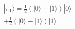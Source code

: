 \documentclass[preview]{standalone}
\begin{document}
\begin{align*}
|\pi_1 \rangle = \frac{1}{2} (|0\rangle - |1\rangle) |0\rangle \\ + \frac{1}{2}(|0\rangle - |1\rangle)|1\rangle
\end{align*}
\end{document}
